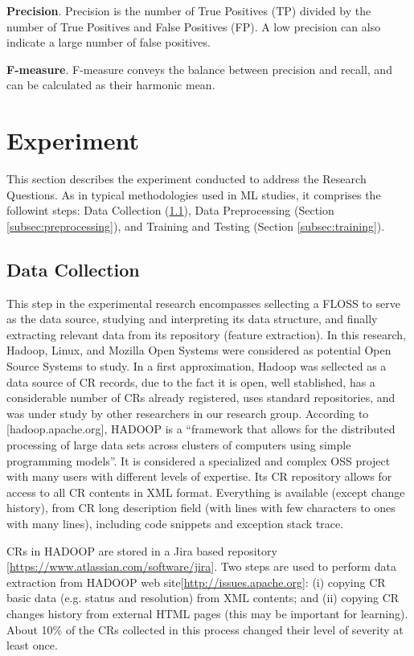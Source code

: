 \documentclass[10pt, conference]{IEEEtran}
\begin{document}
\textbf{Precision}. Precision is the number of True Positives (TP) divided by the number of True Positives and False Positives (FP). A low precision can also indicate a large number of false positives.

\textbf{F-measure}. F-measure conveys the balance between precision and recall, and can be calculated as their harmonic mean. 



\section{Experiment} \label{sec:experiment}
This section describes the experiment conducted to address the Research Questions. As in typical methodologies used in ML studies, it comprises the followint steps: Data Collection (\ref{subsec:collection}), Data Preprocessing (Section \ref{subsec:preprocessing}), and Training and Testing (Section \ref{subsec:training}).

\subsection{Data Collection} 	\label{subsec:collection}
This step in the experimental research encompasses sellecting a FLOSS to serve as the data source, studying and interpreting its data structure, and finally extracting relevant data from its repository (feature extraction). In this research, Hadoop, Linux, and Mozilla Open Systems were considered as potential Open Source Systems to study. In a first approximation, Hadoop was sellected as a data source of CR records, due to the fact it is open, well stablished, has a considerable number of CRs already registered, uses standard repositories, and was under study by other researchers in our research group. According to [hadoop.apache.org], HADOOP is a ``framework that allows for the distributed processing of large data sets across clusters of computers using simple programming models''. It is considered a specialized and complex OSS project with many users with different levels of expertise. Its CR repository allows for access to all CR contents in XML format. Everything is available (except change history), from CR long description field (with lines with few characters to ones with many lines), including code snippets and exception stack trace.

CRs in HADOOP are stored in a Jira based repository [\url{https://www.atlassian.com/software/jira}]. Two steps are used to perform data extraction from HADOOP web site[\url{http://issues.apache.org}]: (i) copying CR basic data (e.g. status and resolution) from XML contents; and (ii) copying CR changes history from external HTML pages (this may be important for learning). About 10\% of the CRs collected in this process changed their level of severity at least once.
\end{document}
